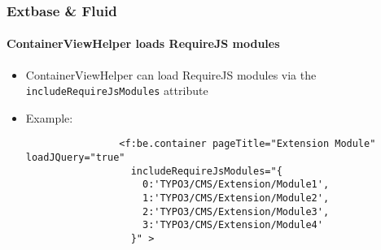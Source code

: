 
\begin{frame}[fragile]
	\frametitle{Extbase \& Fluid}
	\framesubtitle{ContainerViewHelper loads RequireJS modules}

	\begin{itemize}

		\item ContainerViewHelper can load RequireJS modules via the \texttt{includeRequireJsModules} attribute

		\item Example:

			\begin{lstlisting}
				<f:be.container pageTitle="Extension Module" loadJQuery="true"
				  includeRequireJsModules="{
				    0:'TYPO3/CMS/Extension/Module1',
				    1:'TYPO3/CMS/Extension/Module2',
				    2:'TYPO3/CMS/Extension/Module3',
				    3:'TYPO3/CMS/Extension/Module4'
				  }" >
			\end{lstlisting}

	\end{itemize}

\end{frame}


